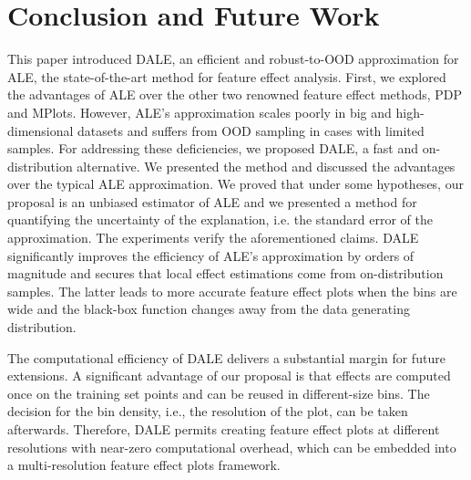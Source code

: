 \documentclass[wcp]{jmlr}
\begin{document}
\section{Conclusion and Future Work}
This paper introduced DALE, an efficient and robust-to-OOD
approximation for ALE, the state-of-the-art method for feature effect
analysis. First, we explored the advantages of ALE over the other two
renowned feature effect methods, PDP and MPlots. However, ALE's
approximation scales poorly in big and high-dimensional datasets and
suffers from OOD sampling in cases with limited samples. For
addressing these deficiencies, we proposed DALE, a fast and
on-distribution alternative. We presented the method and discussed the
advantages over the typical ALE approximation. We proved that under
some hypotheses, our proposal is an unbiased estimator of ALE and we
presented a method for quantifying the uncertainty of the explanation,
i.e. the standard error of the approximation. The experiments verify
the aforementioned claims. DALE significantly improves the efficiency
of ALE's approximation by orders of magnitude and secures that local
effect estimations come from on-distribution samples. The latter leads
to more accurate feature effect plots when the bins are wide and the
black-box function changes away from the data generating distribution.

The computational efficiency of DALE delivers a substantial margin for
future extensions. A significant advantage of our proposal is that
effects are computed once on the training set points and can be reused
in different-size bins. The decision for the bin density, i.e., the
resolution of the plot, can be taken afterwards. Therefore, DALE
permits creating feature effect plots at different resolutions with
near-zero computational overhead, which can be embedded into a
multi-resolution feature effect plots framework.





%






\end{document}
